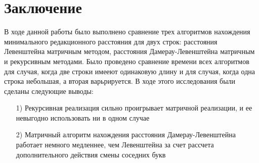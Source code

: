 ﻿\documentclass[a4paper,12pt]{article}
\begin{document}
    \newpage
    \section{Заключение}

    В ходе данной работы было выполнено сравнение трех алгоритмов нахождения минимального редакционного расстояния для двух строк: расстояния Левенштейна матричным методом, расстояния Дамерау-Левенштейна матричным и рекурсивным методами. Было проведено сравнение времени всех алгоритмов для случая, когда две строки имееют одинаковую длину и для случая, когда одна строка небольшая, а вторая варьрируется. В ходе этого исследования были сделаны следующие выводы:

    \begin{enumerate}
        \item[1)] Рекурсивная реализация сильно проигрывает матричной реализации, и ее невыгодно использовать ни в одном случае
        \item[2)] Матричный алгоритм нахождения расстояния Дамерау-Левенштейна работает немного медленнее, чем Левенштейна за счет рассчета дополнительного действия смены соседних букв
    \end{enumerate}
\end{document}
